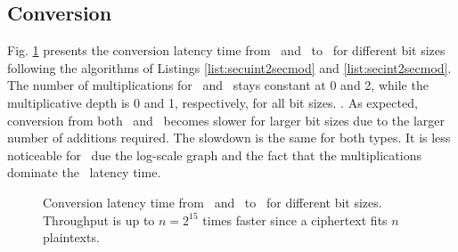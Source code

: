 \subsection{Conversion}\label{ss:conversion}

Fig. \ref{fig:tosecmod} presents the conversion latency time from \secuint\ and \secint\ to \secmod\ for different bit sizes following the algorithms of Listings \ref{list:secuint2secmod} and \ref{list:secint2secmod}. The number of multiplications for \secuint\ and \secint\ stays constant at 0 and 2, while the multiplicative depth is 0 and 1, respectively, for all bit sizes. 
. As expected, conversion from both \secuint\ and \secint\ becomes slower for larger bit sizes due to the larger number of additions required. The slowdown is the same for both types. It is less noticeable for \secint\ due the log-scale graph and the fact that the multiplications dominate the \secint\ latency time.

\begin{figure}[t]
	\centering
	\caption{Conversion latency time from \secuint\ and \secint\ to \secmod\ for different bit sizes. Throughput is up to $n=2^{15}$ times faster since a ciphertext fits $n$ plaintexts.}
	\label{fig:tosecmod}
	\vspace{-0.6cm} 
\end{figure}

